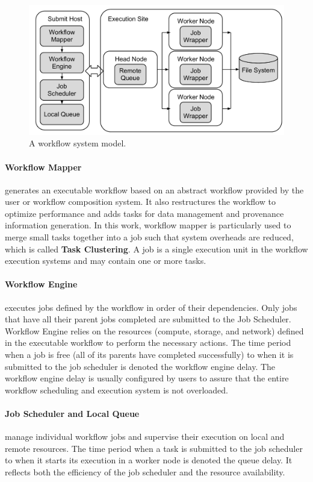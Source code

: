 \documentclass[final]{IEEEtran}
\begin{document}
\begin{figure}[htb]
\centering
  \includegraphics[width=0.95\linewidth]{figure/execution_vertical.pdf}
  \caption{A workflow system model.}
  \label{fig:system}
  \vspace{-15pt}
\end{figure}

\paragraph{Workflow Mapper} generates an executable workflow based on an abstract workflow provided by the user or workflow composition system. It also restructures the workflow to optimize performance and adds tasks for data management and provenance information generation. In this work, workflow mapper is particularly used to merge small tasks together into a job such that system overheads are reduced, which is called \textbf{Task Clustering}. A job is a single execution unit in the workflow execution systems and may contain one or more tasks. 

\paragraph{Workflow Engine} executes jobs defined by the workflow in order of their dependencies. Only jobs that have all their parent jobs completed are submitted to the Job Scheduler. Workflow Engine relies on the resources (compute, storage, and network) defined in the executable workflow to perform the necessary actions. The time period when a job is free (all of its parents have completed successfully) to when it is submitted to the job scheduler is denoted the workflow engine delay. The workflow engine delay is usually configured by users to assure that the entire workflow scheduling and execution system is not overloaded. 

\paragraph{Job Scheduler and Local Queue} manage individual workflow jobs and supervise their execution on local and remote resources. The time period when a task is submitted to the job scheduler to when it starts its execution in a worker node is denoted the queue delay. It reflects both the efficiency of the job scheduler and the resource availability. 
\end{document}
